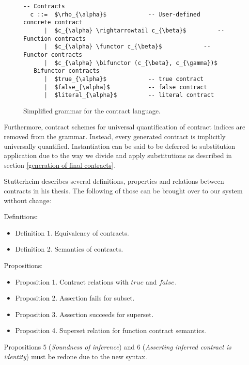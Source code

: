 \documentclass[10pt]{report}
\makeatletter
\newcommand{\functor}{<\!\!\!@\!\!\!>}
\newcommand{\bifunctor}{<\!\!\!@\!\!@\!\!\!>}
\makeatother
\begin{document}
\begin{figure}[htbp]
\begin{center}
\begin{lstlisting}[mathescape]
  -- Contracts
  c ::=  $\rho_{\alpha}$			-- User-defined concrete contract
      |  $c_{\alpha} \rightarrowtail c_{\beta}$			-- Function contracts
      |  $c_{\alpha} \functor c_{\beta}$			-- Functor contracts
      |  $c_{\alpha} \bifunctor (c_{\beta}, c_{\gamma})$			-- Bifunctor contracts
      |  $true_{\alpha}$			-- true contract
      |  $false_{\alpha}$			-- false contract
      |  $literal_{\alpha}$			-- literal contract
\end{lstlisting}
\end{center}
\caption{\label{fig:contract-grammar}Simplified grammar for the contract language.}
\end{figure}

Furthermore, contract schemes for universal quantification of contract indices are removed from the grammar.
Instead, every generated contract is implicitly universally quantified.
Instantiation can be said to be deferred to substitution application due to the way we divide and apply substitutions as described in section \ref{generation-of-final-contracts}.

Stutterheim describes several definitions, properties and relations between contracts in his thesis. 
The following of those can be brought over to our system without change:

Definitions:
\begin{itemize}
	\item Definition 1. Equivalency of contracts.
	\item Definition 2. Semantics of contracts.
\end{itemize}

Propositions:
\begin{itemize}
	\item Proposition 1. Contract relations with $true$ and $false$.
	\item Proposition 2. Assertion fails for subset.
	\item Proposition 3. Assertion succeeds for superset.
	\item Proposition 4. Superset relation for function contract semantics.
\end{itemize}

Propositions 5 (\textit{Soundness of inference}) and 6 (\textit{Asserting inferred contract is identity}) must be redone due to the new syntax.
\end{document}
